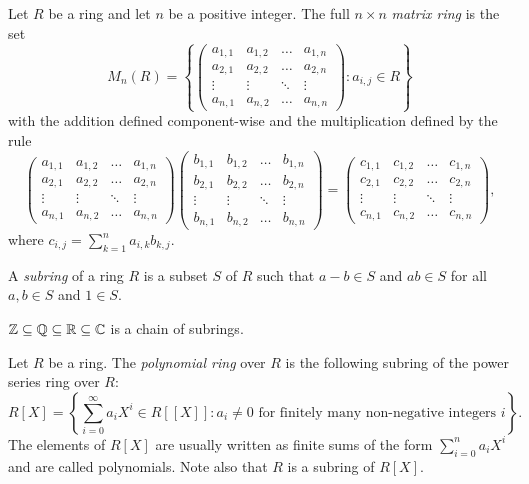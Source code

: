 \begin{example}	
Let $R$ be a ring and let $n$ be a positive integer. 
The full $n\times n$ {\em matrix ring} is the set
$$M_n(R)=\left\{\left(\begin{array}{cccc}
	a_{1,1}&a_{1,2}&\ldots&a_{1,n}\\
	a_{2,1}&a_{2,2}&\ldots&a_{2,n}\\
	\vdots&\vdots&\ddots&\vdots\\
	a_{n,1}&a_{n,2}&\ldots&a_{n,n}
	\end{array}\right): a_{i,j}\in R\right\}$$
with the addition defined component-wise and the multiplication defined by the rule
$$\left(\begin{array}{cccc}
	a_{1,1}&a_{1,2}&\ldots&a_{1,n}\\
	a_{2,1}&a_{2,2}&\ldots&a_{2,n}\\
	\vdots&\vdots&\ddots&\vdots\\
	a_{n,1}&a_{n,2}&\ldots&a_{n,n}
\end{array}\right)\left(\begin{array}{cccc}
b_{1,1}&b_{1,2}&\ldots&b_{1,n}\\
b_{2,1}&b_{2,2}&\ldots&b_{2,n}\\
\vdots&\vdots&\ddots&\vdots\\
b_{n,1}&b_{n,2}&\ldots&b_{n,n}
\end{array}\right)=\left(\begin{array}{cccc}
	c_{1,1}&c_{1,2}&\ldots&c_{1,n}\\
	c_{2,1}&c_{2,2}&\ldots&c_{2,n}\\
	\vdots&\vdots&\ddots&\vdots\\
	c_{n,1}&c_{n,2}&\ldots&c_{n,n}
\end{array}\right),$$
where $c_{i,j}=\sum_{k=1}^na_{i,k}b_{k,j}$.
\end{example}

A {\em subring} of a ring $R$ is a subset $S$ of $R$ such that
$a-b\in S$ and $ab\in S$ for all $a,b\in S$ 
and $1\in S$.


\begin{example}
    $\mathbb{Z}\subseteq\mathbb{Q}\subseteq\mathbb{R}\subseteq\mathbb{C}$ is a chain of subrings.
\end{example}

\begin{example}
	Let $R$ be a ring. The {\em polynomial ring} over $R$ is the following subring of the power series ring over $R$:
	\[
	R[X]=\left\{ \sum_{i=0}^{\infty}a_iX^{i}\in R[\![X]\!] : a_i\neq 0 \mbox{ for finitely many non-negative integers } i \right\}.
	\]
	The elements of $R[X]$ are usually written as finite sums of the 
	form $\sum_{i=0}^na_iX^{i}$ and are called polynomials. Note also that $R$ is a subring of $R[X]$.
\end{example}


